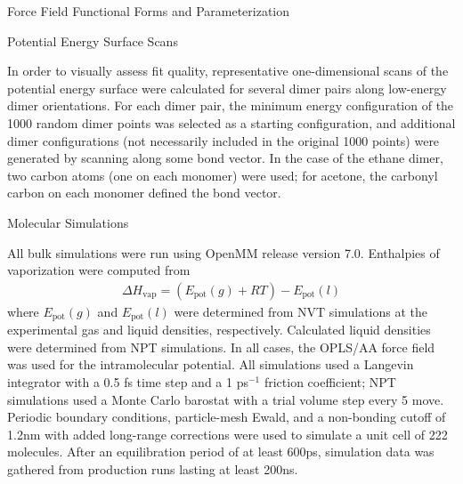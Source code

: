 \begin{subsection}{Force Field Functional Forms and Parameterization}

\end{subsection}
\begin{subsection}{Potential Energy Surface Scans}


In order to visually assess fit quality, representative one-dimensional scans
of the potential energy surface were calculated for several dimer pairs along
low-energy dimer orientations. For each dimer pair, the minimum energy
configuration of the 1000 random dimer points was selected as a starting
configuration, and additional dimer configurations (not necessarily included in the
original 1000 points) were generated by scanning along some bond vector. In the case of the
ethane dimer, two carbon atoms (one on each monomer) were used; for acetone,
the carbonyl carbon on each monomer defined the bond vector.


\end{subsection}


\begin{subsection}{Molecular Simulations}

All bulk simulations were run using OpenMM release version 7.0.
\cite{Eastman2013}
Enthalpies of vaporization were computed from 
%
\begin{align*}
\Delta H_{\text{vap}} = (E_{\text{pot}}(g) + RT) - E_{\text{pot}}(l)
\end{align*}
%
where $E_{\text{pot}}(g)$ and $E_{\text{pot}}(l)$ were determined from NVT
simulations at the experimental gas and liquid densities, respectively.
Calculated liquid
densities were determined from NPT simulations. In all cases, the OPLS/AA
force field was used for the intramolecular potential.
\cite{Jorgensen1996}
All simulations used a Langevin integrator with a 0.5 fs time step and a 1
ps$^{-1}$ friction coefficient; NPT simulations used a Monte Carlo barostat
with a trial volume step every 5 move. Periodic boundary conditions,
particle-mesh Ewald, and a non-bonding cutoff of 1.2nm with added long-range
corrections were used to simulate a
unit cell of 222 molecules. After an equilibration period
of at least 600ps, simulation data was gathered from production runs lasting
at least 200ns. 



\end{subsection}
